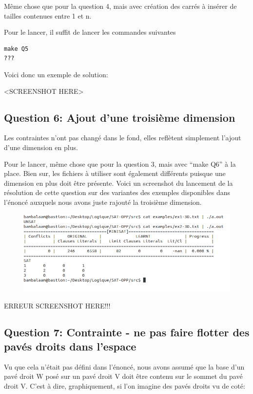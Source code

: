 \documentclass[a4paper,10pt]{article}
\begin{document}
Même chose que pour la question 4, mais avec création des carrés à insérer de tailles contenues entre 1 et n.

Pour le lancer, il suffit de lancer les commandes suivantes
\begin{lstlisting}
make Q5
???
\end{lstlisting}

Voici donc un exemple de solution:

<SCREENSHOT HERE>

\newpage

\subsection{Question 6: Ajout d'une troisième dimension}

Les contraintes n'ont pas changé dans le fond, elles reflètent simplement l'ajout d'une dimension en plus.

Pour le lancer, même chose que pour la question 3, mais avec ``make Q6'' à la place. Bien sur, les fichiers à utiliser sont également différents puisque une dimension en plus doit être présente. Voici un screenshot du lancement de la résolution de cette question sur des variantes des exemples disponibles dans l'énoncé auxquels nous avons juste rajouté la troisième dimension.

\begin{figure}[htb!]
\centering
\includegraphics[scale=0.50]{SAT-3D}
\end{figure}

ERREUR SCREENSHOT HERE!!!

\subsection{Question 7: Contrainte - ne pas faire flotter des pavés droits dans l'espace}

Vu que cela n'était pas défini dans l'énoncé, nous avons assumé que la base d'un pavé droit W posé sur un pavé droit V doit être contenu sur le sommet du pavé droit V. C'est à dire, graphiquement, si l'on imagine des pavés droits vu de coté:
\end{document}
